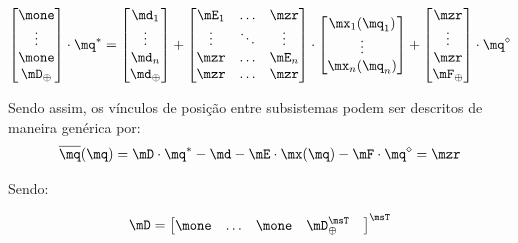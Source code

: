\documentclass[]{politex}
\begin{document}
\begin{equation} \label{eq:VinculosPosicao2}
\begin{bmatrix}
\mone\\
\vdots\\
\mone \\
\mD_{\oplus}
\end{bmatrix}
\cdot
\mq^\ast =
\begin{bmatrix}
\md_1 \\
\vdots \\
\md_n \\
\md_{\oplus}
\end{bmatrix}
+
\begin{bmatrix}
\mE_1 & \ldots & \mzr\\
\vdots & \ddots & \vdots\\
\mzr &\ldots  & \mE_{n} \\
\mzr &\ldots  & \mzr
\end{bmatrix}
\cdot
\begin{bmatrix}
\mx_1(\mq_1) \\
\vdots \\
\mx_n(\mq_n)
\end{bmatrix}
+
\begin{bmatrix}
\mzr\\
\vdots\\
\mzr \\
\mF_{\oplus}
\end{bmatrix}
\cdot
\mq^\diamond
\end{equation}



Sendo assim, os vínculos de posição entre subsistemas podem ser descritos de maneira genérica por:
\begin{equation} \label{eq:VinculosGenericosPosicao}
\overline{\mq}(\mq) = \mD \cdot \mq^\ast - \md - \mE \cdot \mx(\mq)
- \mF \cdot \mq^\diamond = \mzr
\end{equation}


Sendo:

\begin{equation}
\mD = \begin{bmatrix}
\mone &
\hdots &
\mone &
\mD_{\oplus}^\msT &
\end{bmatrix}^\msT
\end{equation}
\end{document}
